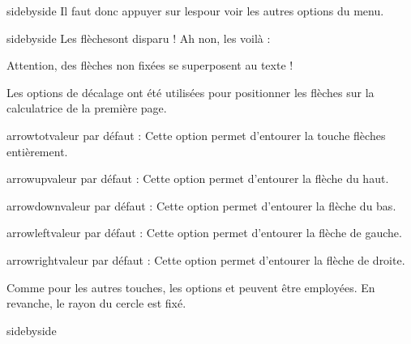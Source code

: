 \documentclass[10pt,french,a4paper]{article}
\begin{document}
\begin{dispExample*}{sidebyside}
Il faut donc appuyer sur les\Touche[style=arrows, raise=-0.15cm, scalearrows=0.25] pour voir les autres options du menu.
\end{dispExample*}

\begin{dispExample*}{sidebyside}
Les flèches\Touche[style=arrows, fixed=false, xoffset=4.5cm, scalearrows=0.5] ont disparu ! Ah non, les voilà :

Attention, des flèches non fixées \Touche[style=arrows, fixed=false, scalearrows=0.5] se superposent au texte !
\end{dispExample*}

Les options de décalage ont été utilisées pour positionner les flèches sur la calculatrice de la première page.

\begin{docKey}{arrowtot}{}{valeur par défaut : }
    Cette option permet d'entourer la touche flèches entièrement.
\end{docKey}

\begin{docKey}{arrowup}{}{valeur par défaut : }
    Cette option permet d'entourer la flèche du haut.
\end{docKey}

\begin{docKey}{arrowdown}{}{valeur par défaut : }
    Cette option permet d'entourer la flèche du bas.
\end{docKey}

\begin{docKey}{arrowleft}{}{valeur par défaut : }
    Cette option permet d'entourer la flèche de gauche.
\end{docKey}

\begin{docKey}{arrowright}{}{valeur par défaut : }
    Cette option permet d'entourer la flèche de droite.
\end{docKey}

Comme pour les autres touches, les options  et  peuvent être employées. En revanche, le rayon du cercle est fixé.

\begin{dispExample*}{sidebyside}
\Touche[style=arrows, arrowtot=true, scalearrows=0.5]
\Touche[style=arrows, arrowleft=true, scalearrows=0.5]
\Touche[style=arrows, arrowup=true, scalearrows=0.5]
\end{dispExample*}
\end{document}
